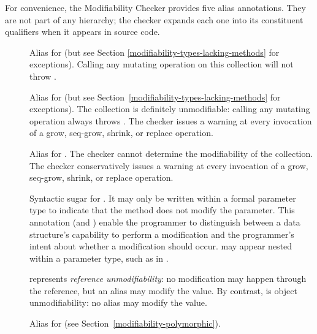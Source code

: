 
For convenience, the Modifiability Checker provides five alias
annotations.  They are not part of any hierarchy; the checker expands
each one into its constituent qualifiers when it appears in source code.

\begin{description}

\item[]
Alias for  (but see
Section \ref{modifiability-types-lacking-methods} for exceptions).  Calling
any mutating operation on this collection will not throw
\UnsupportedOperationException.

\item[]
Alias for  (but see
Section~\ref{modifiability-types-lacking-methods} for exceptions).  The
collection is definitely unmodifiable: calling any mutating operation
always throws \UnsupportedOperationException.  The checker issues a warning
at every invocation of a grow, seq-grow, shrink, or replace operation.

\item[]
Alias for .
The checker cannot determine the modifiability of the collection.
The checker conservatively issues a warning at every invocation of a grow,
seq-grow, shrink, or replace operation.

\item[]
Syntactic sugar for .
It may only be written within a formal parameter type to indicate that the
method does not modify the parameter.  This annotation (and
) enable the
programmer to distinguish between a data structure's capability to perform
a modification and the programmer's intent about whether a modification
should occur.
may appear nested within a parameter type, such as in
.

 represents
\emph{reference unmodifiability}:  no modification may happen through the
reference, but an alias may modify the value.  By contrast,
 is object
unmodifiability:  no alias may modify the value.

\item[]
Alias for 
(see Section~\ref{modifiability-polymorphic}).

\end{description}

